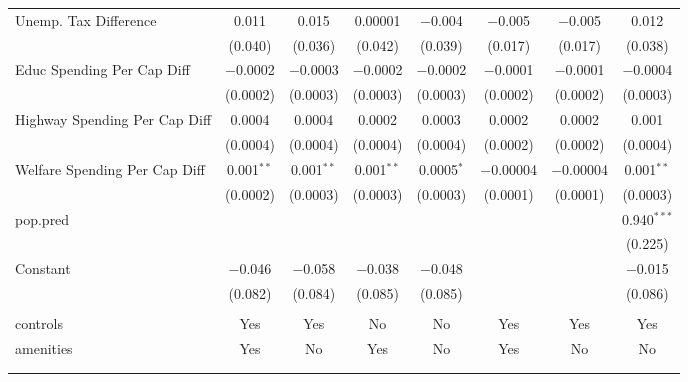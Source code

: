 \begin{table}[!htbp]
\begin{tabular}{@{\extracolsep{5pt}}lccccccc}
  Unemp. Tax Difference & 0.011 & 0.015 & 0.00001 & $-$0.004 & $-$0.005 & $-$0.005 & 0.012 \\ 
  & (0.040) & (0.036) & (0.042) & (0.039) & (0.017) & (0.017) & (0.038) \\ 
  Educ Spending Per Cap Diff & $-$0.0002 & $-$0.0003 & $-$0.0002 & $-$0.0002 & $-$0.0001 & $-$0.0001 & $-$0.0004 \\ 
  & (0.0002) & (0.0003) & (0.0003) & (0.0003) & (0.0002) & (0.0002) & (0.0003) \\ 
  Highway Spending Per Cap Diff & 0.0004 & 0.0004 & 0.0002 & 0.0003 & 0.0002 & 0.0002 & 0.001 \\ 
  & (0.0004) & (0.0004) & (0.0004) & (0.0004) & (0.0002) & (0.0002) & (0.0004) \\ 
  Welfare Spending Per Cap Diff & 0.001$^{**}$ & 0.001$^{**}$ & 0.001$^{**}$ & 0.0005$^{*}$ & $-$0.00004 & $-$0.00004 & 0.001$^{**}$ \\ 
  & (0.0002) & (0.0003) & (0.0003) & (0.0003) & (0.0001) & (0.0001) & (0.0003) \\ 
  pop.pred &  &  &  &  &  &  & 0.940$^{***}$ \\ 
  &  &  &  &  &  &  & (0.225) \\ 
  Constant & $-$0.046 & $-$0.058 & $-$0.038 & $-$0.048 &  &  & $-$0.015 \\ 
  & (0.082) & (0.084) & (0.085) & (0.085) &  &  & (0.086) \\ 
 \hline \\[-1.8ex] 
controls & Yes & Yes & No & No & Yes & Yes & Yes \\ 
amenities & Yes & No & Yes & No & Yes & No & No \\ 
\hline \\[-1.8ex] 
\hline 
\hline \\[-1.8ex] 
\end{tabular} 
\end{table} 
